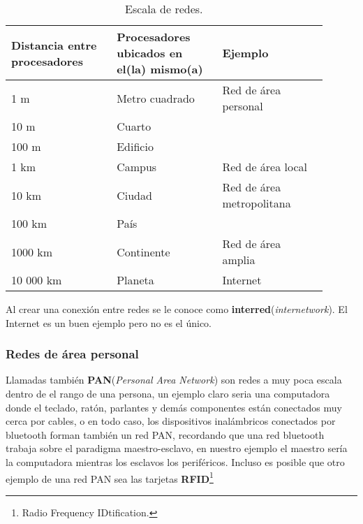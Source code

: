 \documentclass[
	12pt, %
	fleqn, %
	a4paper, %
]{LegrandOrangeBook}
\begin{document}
\begin{table}[H]
\begin{tabular}{|m{0.3\linewidth}|m{0.3\linewidth}|m{0.3\linewidth}|}
\hline
\rowcolor[HTML]{9698ED} 
Distancia entre procesadores & Procesadores ubicados en el(la) mismo(a) & Ejemplo                              \\ \hline
1 m                          & Metro cuadrado                           & Red de área personal                 \\ \hline
10 m                         & Cuarto                                   &                                      \\ \cline{1-2}
100 m                        & Edificio                                 &                                      \\ \cline{1-2}
1 km                         & Campus                                   & \multirow{-3}{*}{Red de área local}  \\ \hline
10 km                        & Ciudad                                   & Red de área metropolitana            \\ \hline
100 km                       & País                                     &                                      \\ \cline{1-2}
1000 km                      & Continente                               & \multirow{-2}{*}{Red de área amplia} \\ \hline
10 000 km                    & Planeta                                  & Internet                             \\ \hline
\end{tabular}
\caption{Escala de redes.}
\end{table}
Al crear una conexión entre redes se le conoce como \textbf{interred}(\textit{internetwork}). El Internet es un buen ejemplo pero no es el único.
\subsubsection{Redes de área personal}
Llamadas también \textbf{PAN}(\textit{Personal Area Network}) son redes a muy poca escala dentro de el rango de una persona, un ejemplo claro seria una computadora donde el teclado, ratón, parlantes y demás componentes están conectados muy cerca por cables, o en todo caso, los dispositivos inalámbricos conectados por bluetooth forman también un red PAN, recordando que una red bluetooth trabaja sobre el paradigma maestro-esclavo, en nuestro ejemplo el maestro sería la computadora mientras los esclavos los periféricos. Incluso es posible que otro ejemplo de una red PAN sea las tarjetas \textbf{RFID}\footnote{Radio Frequency IDtification.}
\end{document}
